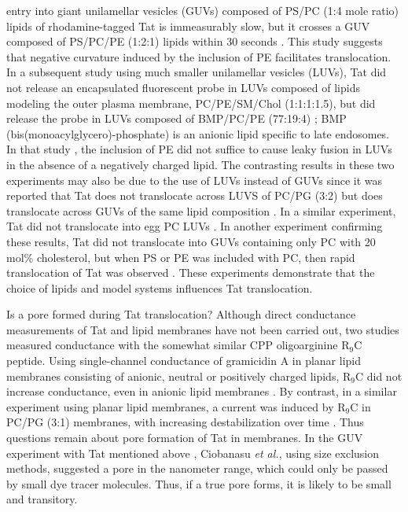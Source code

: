 entry into giant
unilamellar vesicles (GUVs) composed of PS/PC (1:4 mole ratio) lipids of 
rhodamine-tagged Tat
is immeasurably slow, but it crosses a GUV composed of PS/PC/PE (1:2:1) lipids 
within 30
seconds \cite{Mishra08}. 
This study suggests that negative curvature induced by the 
inclusion of PE facilitates translocation. 
In a subsequent study using much smaller unilamellar vesicles (LUVs),
Tat did not release an encapsulated fluorescent probe in LUVs composed of 
lipids modeling the outer plasma membrane, PC/PE/SM/Chol (1:1:1:1.5), 
but did release the probe in LUVs composed of BMP/PC/PE (77:19:4) \cite{Yang10}; 
BMP (bis(monoacylglycero)-phosphate) is an anionic lipid specific to late 
endosomes. In that study \cite{Yang10}, the inclusion of PE did not suffice to 
cause leaky fusion in LUVs in the absence of a negatively charged lipid. The 
contrasting results in these two experiments may also be due to the use of LUVs 
instead of GUVs since it was reported that Tat does not translocate across LUVS 
of PC/PG (3:2) but does translocate across GUVs of the same lipid composition 
\cite{Thoren04}. In a similar experiment, Tat did not translocate into egg PC
LUVs \cite{Kramer03}. In another experiment confirming these results, Tat did 
not translocate into GUVs containing only PC with 20 mol\% cholesterol, but 
when PS or PE was included with PC, then rapid translocation of Tat was observed 
\cite{Ciobanasu10}. These experiments demonstrate that the choice of lipids and 
model systems influences Tat translocation.

Is a pore formed during Tat translocation? Although direct conductance 
measurements of Tat and lipid membranes have not been carried out, two studies 
measured conductance with the somewhat similar CPP oligoarginine R$_9$C peptide. 
Using single-channel conductance of gramicidin A in planar lipid membranes 
consisting of anionic, neutral or positively charged lipids, R$_9$C did not 
increase conductance, even in anionic lipid membranes \cite{Gurnev13}. 
By contrast, in a similar experiment using planar lipid membranes, a current 
was induced by R$_9$C in PC/PG (3:1) membranes, with increasing destabilization 
over time \cite{Herce09}. Thus questions remain about pore formation of Tat in 
membranes. In the GUV experiment with Tat mentioned above \cite{Ciobanasu10},
Ciobanasu \textit{et al.}, using size exclusion methods, suggested a pore in the 
nanometer range, which could only be passed by small dye tracer molecules. Thus, 
if a true pore forms, it is likely to be small and transitory.

